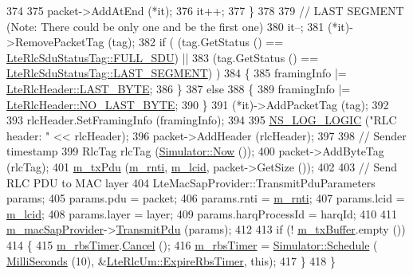 \begin{DoxyCode}
374 
375       packet->AddAtEnd (*it);
376       it++;
377     \}
378 
379   \textcolor{comment}{// LAST SEGMENT (Note: There could be only one and be the first one)}
380   it--;
381   (*it)->RemovePacketTag (tag);
382   \textcolor{keywordflow}{if} ( (tag.GetStatus () == \hyperlink{classns3_1_1LteRlcSduStatusTag_ae7822c5cc0d54a3d193b09a91ed6f133ade41b0025c66cd211e992196f314d4a5}{LteRlcSduStatusTag::FULL\_SDU}) ||
383         (tag.GetStatus () == \hyperlink{classns3_1_1LteRlcSduStatusTag_ae7822c5cc0d54a3d193b09a91ed6f133a4e59540a0a5c4530b61e4feda355be7b}{LteRlcSduStatusTag::LAST\_SEGMENT}) )
384     \{
385       framingInfo |= \hyperlink{classns3_1_1LteRlcHeader_abf2c6056d7e9ebe1872e2243e5fc65aaa0cb019a1055c009eb8c8ff34f796cb89}{LteRlcHeader::LAST\_BYTE};
386     \}
387   \textcolor{keywordflow}{else}
388     \{
389       framingInfo |= \hyperlink{classns3_1_1LteRlcHeader_abf2c6056d7e9ebe1872e2243e5fc65aaac36f5c572c5ab51ef1652c5d4e4c9e7d}{LteRlcHeader::NO\_LAST\_BYTE};
390     \}
391   (*it)->AddPacketTag (tag);
392 
393   rlcHeader.SetFramingInfo (framingInfo);
394 
395   \hyperlink{group__logging_ga88acd260151caf2db9c0fc84997f45ce}{NS\_LOG\_LOGIC} (\textcolor{stringliteral}{"RLC header: "} << rlcHeader);
396   packet->AddHeader (rlcHeader);
397 
398   \textcolor{comment}{// Sender timestamp}
399   RlcTag rlcTag (\hyperlink{classns3_1_1Simulator_ac3178fa975b419f7875e7105be122800}{Simulator::Now} ());
400   packet->AddByteTag (rlcTag);
401   \hyperlink{classns3_1_1LteRlc_aa14f9d8b8828d0b0859f1870ae1248e6}{m\_txPdu} (\hyperlink{classns3_1_1LteRlc_a48ab0a78e7f2687337075b1c8832df70}{m\_rnti}, \hyperlink{classns3_1_1LteRlc_a051085e9b27883e7ba4b98ad7242fd8a}{m\_lcid}, packet->GetSize ());
402 
403   \textcolor{comment}{// Send RLC PDU to MAC layer}
404   LteMacSapProvider::TransmitPduParameters params;
405   params.pdu = packet;
406   params.rnti = \hyperlink{classns3_1_1LteRlc_a48ab0a78e7f2687337075b1c8832df70}{m\_rnti};
407   params.lcid = \hyperlink{classns3_1_1LteRlc_a051085e9b27883e7ba4b98ad7242fd8a}{m\_lcid};
408   params.layer = layer;
409   params.harqProcessId = harqId;
410 
411   \hyperlink{classns3_1_1LteRlc_a69272d17c4e48183bb89b8dd0660c1be}{m\_macSapProvider}->\hyperlink{classns3_1_1LteMacSapProvider_a125622cc614fa4ef620d595fbec0cf07}{TransmitPdu} (params);
412 
413   \textcolor{keywordflow}{if} (! \hyperlink{classns3_1_1LteRlcUm_ac2c10aa57585dbea3797d651f3dce7be}{m\_txBuffer}.empty ())
414     \{
415       \hyperlink{classns3_1_1LteRlcUm_a8196c33f6c1c18fe6dae6be6639f8c06}{m\_rbsTimer}.\hyperlink{classns3_1_1EventId_a993ae94e48e014e1afd47edb16db7a11}{Cancel} ();
416       \hyperlink{classns3_1_1LteRlcUm_a8196c33f6c1c18fe6dae6be6639f8c06}{m\_rbsTimer} = \hyperlink{classns3_1_1Simulator_a671882c894a08af4a5e91181bf1eec13}{Simulator::Schedule} (
      \hyperlink{group__timecivil_gaf26127cf4571146b83a92ee18679c7a9}{MilliSeconds} (10), &\hyperlink{classns3_1_1LteRlcUm_aaec66683c9a4e4b40965f0d85a3ce338}{LteRlcUm::ExpireRbsTimer}, \textcolor{keyword}{this});
417     \}
418 \}
\end{DoxyCode}


